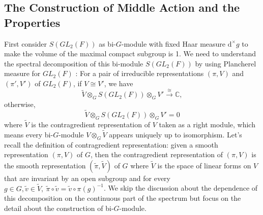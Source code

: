 \documentclass[12pt,a4paper,english]{article}
\theoremstyle{plain}
\theoremstyle{definition}
\begin{document}
\subsection{The Construction of Middle Action and the Properties}
First consider $S(GL_{2}(F))$ 
 as bi-$G$-module with fixed Haar measure $\text{d}^{\times}g$ to make the volume of the maximal compact subgroup is 1. We need to understand the spectral decomposition of this bi-module $S(GL_{2}(F))$ by using Plancherel measure for $GL_2(F)$ \cite{arthur1991local}:
 For a pair of irreducible representations $(\pi,V)$ and $(\pi',V')$ of $GL_{2}(F)$, if $V\cong V'$, we have  
 \begin{equation*}
\widetilde{V}\otimes_{G}S(GL_{2}(F))\otimes_{G}V'\xrightarrow{\cong}\mathbb{C},
 \end{equation*}
otherwise,
\begin{equation*}
\widetilde{V}\otimes_{G}S(GL_{2}(F))\otimes_{G}V'=0
\end{equation*}
where $\widetilde{V}$ is the contragredient representation of $V$ taken as a right module, which means every bi-$G$-module $V\otimes_{G}\widetilde{V}$ appears uniquely up to isomorphism. Let's recall the definition of contragredient representation: given a smooth representation $(\pi, V)$ of $G$, then the contragredient representation of $(\pi, V)$ is the smooth representation $(\tilde{\pi}, \widetilde{V})$ of $G$ where $\tilde{V}$ is the space of linear forms on $V$ that are invariant by an open subgroup and for every $g\in G, \tilde{v}\in \tilde{V},\  \tilde{\pi}\circ\tilde{v}=\tilde{v}\circ\pi(g)^{-1}$. 
We skip the discussion about the dependence of this decomposition on the continuous part of the spectrum but focus on the detail about the construction of bi-$G$-module. 
\end{document}

